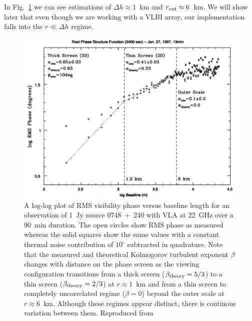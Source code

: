 In Fig.~\ref{fig:screentransition} we can see estimations of $\Delta h \approx 1$~km and $r_{\rm out} \approx 6$~km. We will show later that even though we are working with a VLBI array, our implementation falls into the $r \ll \Delta h$ regime.


\begin{figure}
\begin{center}
\includegraphics[width=\columnwidth]{Images/screentransition}
\caption{A log-log plot of RMS visibility phase versus baseline length for an observation of 1~Jy source 0748~+~240 with VLA at 22~GHz over a 90~min duration. The open circles show RMS phase as measured whereas the solid squares show the same values with a constant thermal noise contribution of $10^\circ$ subtracted in quadrature. Note that the measured and theoretical Kolmogorov turbulent exponent $\beta$ changes with distance on the phase screen as the viewing configuration transitions from a thick screen ($\beta_{\rm theory} = 5/3$) to a thin screen ($\beta_{\rm theory} = 2/3$) at $r \approx 1$~km and from a thin screen to completely uncorrelated regime ($\beta = 0$) beyond the outer scale at $r \approx 6$~km. Although these regimes appear distinct, there is continous variation between them. Reproduced from \citet*{Carilli_1997} \label{fig:screentransition}
}
\end{center}
\end{figure}

